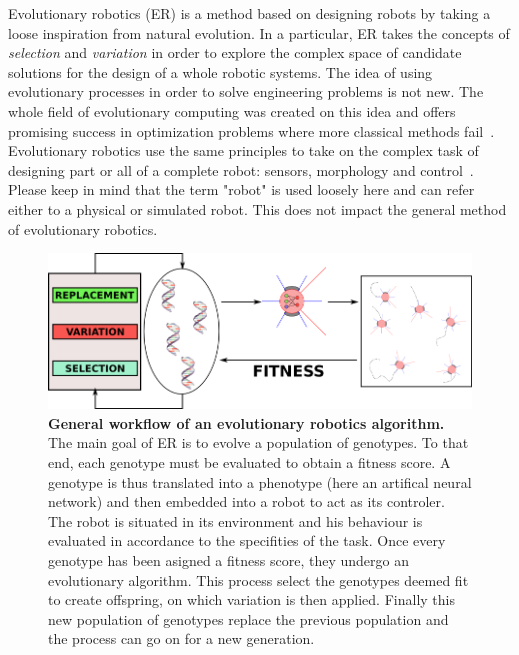     Evolutionary robotics (ER) is a method based on designing robots by taking a loose inspiration from natural evolution. In a particular, ER takes the concepts of \emph{selection} and \emph{variation} in order to explore the complex space of candidate solutions for the design of a whole robotic systems. The idea of using evolutionary processes in order to solve engineering problems is not new. The whole field of evolutionary computing was created on this idea and offers promising success in optimization problems where more classical methods fail~\parencite{Holland1975, Goldberg1989, Eiben2015}. Evolutionary robotics use the same principles to take on the complex task of designing part or all of a complete robot: sensors, morphology and control~\parencite{Nolfi2000, Floreano2008, Doncieux2015a}. Please keep in mind that the term "robot" is used loosely here and can refer either to a physical or simulated robot. This does not impact the general method of evolutionary robotics.


    \begin{figure}[hbt]
        \begin{center}
          \includegraphics[scale = 0.50]{fig/Intro/EvolutionaryRobotics.png}
          \caption{\textbf{General workflow of an evolutionary robotics algorithm.}
          The main goal of ER is to evolve a population of genotypes. To that end, each genotype must be evaluated to obtain a fitness score. A genotype is thus translated into a phenotype (here an artifical neural network) and then embedded into a robot to act as its controler. The robot is situated in its environment and his behaviour is evaluated in accordance to the specifities of the task. Once every genotype has been asigned a fitness score, they undergo an evolutionary algorithm. This process select the genotypes deemed fit to create offspring, on which variation is then applied. Finally this new population of genotypes replace the previous population and the process can go on for a new generation.} 
          \label{fig:EvolutionaryRobotics}
        \end{center}
    \end{figure}

